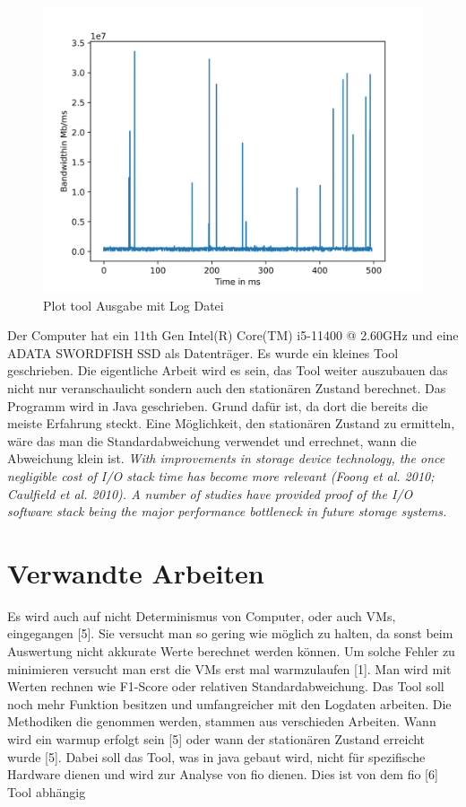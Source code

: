 \documentclass{article}
\begin{document}
\begin{figure}[ht!]
    \centering
    \includegraphics[width=120mm]{./Code/nm_mytest_bw.jpg}
    \caption{Plot tool Ausgabe mit Log Datei  \label{overflow}}
\end{figure}
Der Computer hat ein 11th Gen Intel(R) Core(TM) i5-11400 @ 2.60GHz und eine ADATA SWORDFISH SSD als Datenträger.
Es wurde ein kleines Tool geschrieben. Die eigentliche Arbeit wird es sein, das Tool weiter auszubauen das nicht nur veranschaulicht
sondern auch den stationären Zustand berechnet. Das Programm wird in Java geschrieben. Grund dafür ist, da dort die bereits die meiste Erfahrung steckt.
Eine Möglichkeit, den stationären Zustand zu ermitteln, wäre das man die Standardabweichung verwendet und errechnet, wann die Abweichung klein ist.
\newpage
\textit{With improvements in storage device technology, the once negligible cost of I/O stack time has become more relevant (Foong et al. 2010; Caulfield et al. 2010). A number
of studies have provided proof of the I/O software stack being the major performance bottleneck in future storage systems.}
\section{Verwandte Arbeiten}
Es wird auch auf nicht Determinismus von Computer, oder auch VMs, eingegangen [5]. Sie versucht man so gering wie möglich zu halten, da sonst beim Auswertung nicht akkurate Werte
berechnet werden können. Um solche Fehler zu minimieren versucht man erst die VMs erst mal warmzulaufen [1]. Man wird mit Werten rechnen wie F1-Score oder relativen Standardabweichung.
Das Tool soll noch mehr Funktion besitzen und umfangreicher mit den Logdaten arbeiten. Die Methodiken die genommen werden, stammen aus verschieden Arbeiten. Wann wird ein warmup erfolgt sein [5]
oder wann der stationären Zustand erreicht wurde [5]. Dabei soll das Tool, was in java gebaut wird, nicht für spezifische Hardware dienen und wird zur Analyse von fio dienen. Dies ist von dem fio [6] Tool abhängig  
\end{document}
